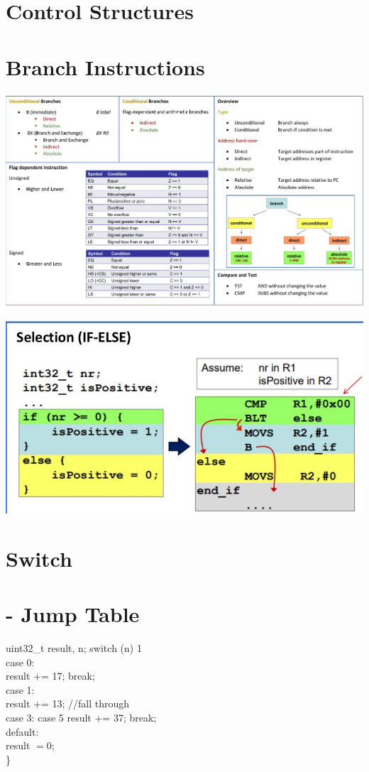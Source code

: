 \section{Control Structures}

\section*{Branch Instructions}
\begin{center}
\includegraphics[width=\linewidth]{images/2024_12_29_79e6b22f503fb7b4f718g-05}
\end{center}

\begin{center}
    \includegraphics[width=\linewidth]{images/2024_12_29_79e6b22f503fb7b4f718g-07(3)}
    \end{center}
    
    \section*{Switch}
    \section*{- Jump Table}
    uint32\_t result, n; switch (n) 1\\
    case 0:\\
    result += 17; break;\\
    case 1:\\
    result += 13; //fall through\\
    case 3: case 5 result += 37; break;\\
    default:\\
    result $=0$;\\
    \}
    
